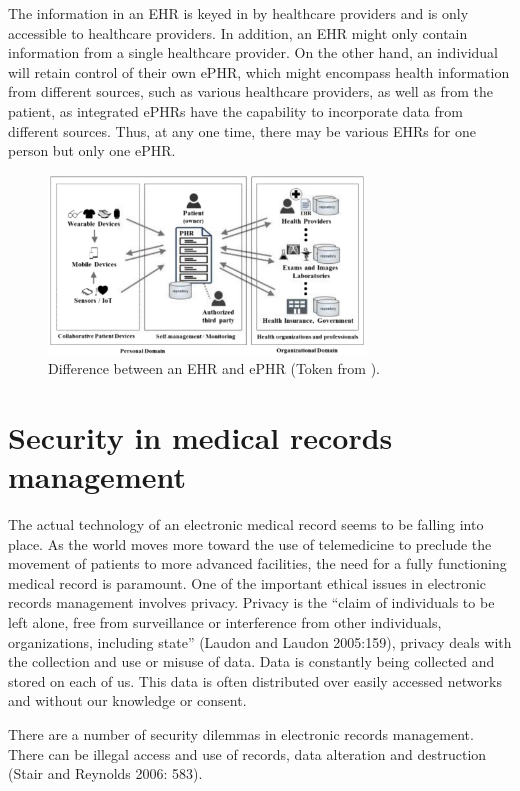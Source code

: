 The information in an EHR is keyed in by healthcare providers and is only accessible to healthcare providers. In addition, an EHR might only contain information from a single healthcare provider. On the other hand, an individual will retain control of their own ePHR, which might encompass health information from different sources, such as various healthcare providers, as well as from the patient, as integrated ePHRs have the capability to incorporate data from different sources. Thus, at any one time, there may be various EHRs for one person but only one ePHR\cite{alsahafiOverviewElectronicPersonal2018}.
\begin{figure}[h!]
  \center
  \includegraphics[width=0.75\textwidth]{images/chapter1/phr_ehr.PNG}
  \caption{Difference between an EHR and ePHR (Token from \cite{alsahafiOverviewElectronicPersonal2018}).}
  \label{fig:ehrvsphr}
\end{figure}

\section{Security in medical records management}
The actual technology of an electronic medical record seems to be falling into place. As the world moves more toward the use of telemedicine to preclude the movement of patients to more advanced facilities, the need for a fully functioning medical record is paramount.
One of the important ethical issues in electronic records management involves privacy. Privacy is the “claim of individuals to be left alone, free from surveillance or interference from other individuals, organizations, including state” (Laudon and Laudon 2005:159), privacy deals with the collection and use or misuse of data. Data is constantly being collected and stored on each of us. This data is often distributed over easily accessed networks and without our knowledge or consent\cite{ngoepeSecurityPrivacyEthics2011}.
 
 
There are a number of security dilemmas in electronic records management. There can be illegal access and use of records, data alteration and destruction (Stair and Reynolds 2006: 583).

